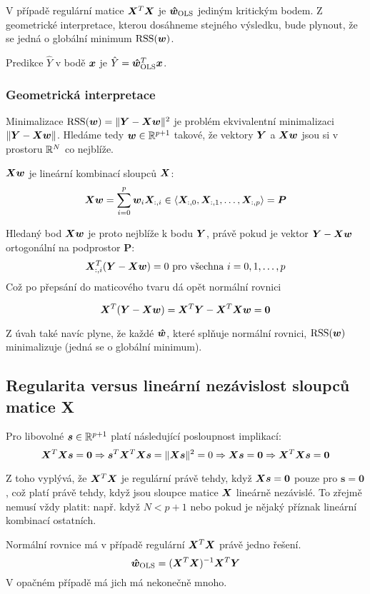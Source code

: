 \documentclass[../main.tex]{subfiles}
\begin{document}
V případě regulární matice $\bm{X}^T\bm{X}$ je $\bm{\hat{w}}_{\text{OLS}}$ jediným kritickým bodem. Z geometrické interpretace, kterou dosáhneme stejného výsledku, bude plynout, že se jedná o globální minimum $\operatorname{RSS}(\bm{w})$.

Predikce $\hat{Y}$ v bodě $\bm{x}$ je $\hat{Y} = \bm{\hat{w}}_{\text{OLS}}^T \bm{x}$.

\subsubsection{Geometrická interpretace}

Minimalizace $\operatorname{RSS}(\bm{w}) = \| \bm{Y} - \bm{X} \bm{w} \|^2$ je problém ekvivalentní minimalizaci ${\| \bm{Y} - \bm{X} \bm{w} \|}$. Hledáme tedy $\bm{w} \in \mathbb{R}^{p+1}$ takové, že vektory $\bm{Y}$ a $\bm{X}\bm{w}$ jsou si v prostoru $\mathbb{R}^{N}$ co nejblíže.

$\bm{X}\bm{w}$ je lineární kombinací sloupců $\bm{X}$:
\[ \bm{X}\bm{w} = \sum_{i=0}^{p} \bm{w}_i \bm{X}_{:,i} \in \langle \bm{X}_{:,0}, \bm{X}_{:,1}, \ldots, \bm{X}_{:,p} \rangle = \bm{P} \]

Hledaný bod $\bm{X}\bm{w}$ je proto nejblíže k bodu $\bm{Y}$, právě pokud je vektor $\bm{Y} - \bm{X}\bm{w}$ ortogonální na podprostor $\bm{P}$:
\[ \bm{X}_{:,i}^T(\bm{Y} - \bm{X}\bm{w}) = 0 \text{ pro všechna } i = 0, 1, \ldots, p \]
Což po přepsání do maticového tvaru dá opět normální rovnici

\[ \bm{X}^T(\bm{Y} - \bm{X}\bm{w}) = \bm{X}^T\bm{Y} - \bm{X}^T\bm{X}\bm{w} = \bm{0} \]

Z úvah také navíc plyne, že každé $\bm{\hat{w}}$, které splňuje normální rovnici, $\operatorname{RSS}(\bm{w})$ minimalizuje (jedná se o globální minimum).

\subsection{Regularita versus lineární nezávislost sloupců matice X}

Pro libovolné $\bm{s} \in \mathbb{R}^{p+1}$ platí následující posloupnost implikací:
\[
    \bm{X}^T\bm{X}\bm{s} = \mathbf{0}
    \Rightarrow \bm{s}^T\bm{X}^T\bm{X}\bm{s} = \|\bm{X}\bm{s}\|^2 = 0
    \Rightarrow \bm{X}\bm{s} = \bm{0}
    \Rightarrow \bm{X}^T\bm{X}\bm{s} = \mathbf{0}
\]

Z toho vyplývá, že $\bm{X}^T\bm{X}$ je regulární právě tehdy, když $\bm{X}\bm{s} = \bm{0}$ pouze pro $\bm{s} = \bm{0}$, což platí právě tehdy, když jsou sloupce matice $\bm{X}$ lineárně nezávislé. To zřejmě nemusí vždy platit: např. když $N < p+1$ nebo pokud je nějaký příznak lineární kombinací ostatních.

Normální rovnice má v případě regulární $\bm{X}^T \bm{X}$ právě jedno řešení.
\[ \bm{\hat{w}}_{\text{OLS}} = (\bm{X}^T \bm{X})^{-1} \bm{X}^T \bm{Y} \]
V opačném případě má jich má nekonečně mnoho.
\end{document}
